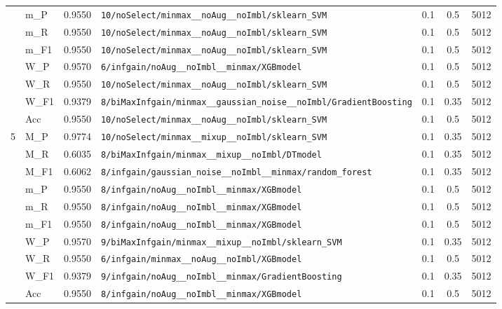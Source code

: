 \begin{table}[htbp]
\begin{tabular}{|c|l|c|>{\ttfamily\footnotesize}p{7.2cm}|c|c|c|}
 & m\_P & 0.9550 & \texttt{10/noSelect/minmax\_\_noAug\_\_noImbl/sklearn\_SVM} & 0.1 & 0.5  & 5012 \\ 
 & m\_R & 0.9550 & \texttt{10/noSelect/minmax\_\_noAug\_\_noImbl/sklearn\_SVM} & 0.1 & 0.5  & 5012 \\ 
 & m\_F1 & 0.9550 & \texttt{10/noSelect/minmax\_\_noAug\_\_noImbl/sklearn\_SVM} & 0.1 & 0.5  & 5012 \\ 
 & W\_P & 0.9570 & \texttt{6/infgain/noAug\_\_noImbl\_\_minmax/XGBmodel} & 0.1 & 0.5  & 5012 \\ 
 & W\_R & 0.9550 & \texttt{10/noSelect/minmax\_\_noAug\_\_noImbl/sklearn\_SVM} & 0.1 & 0.5  & 5012 \\ 
 & W\_F1 & 0.9379 & \texttt{8/biMaxInfgain/minmax\_\_gaussian\_noise\_\_noImbl/GradientBoosting} & 0.1 & 0.35  & 5012 \\ 
 & Acc & 0.9550 & \texttt{10/noSelect/minmax\_\_noAug\_\_noImbl/sklearn\_SVM} & 0.1 & 0.5  & 5012 \\ 
\hline
\multirow{10}{*}{5} & M\_P & 0.9774 & \texttt{10/noSelect/minmax\_\_mixup\_\_noImbl/sklearn\_SVM} & 0.1 & 0.35  & 5012 \\ 
 & M\_R & 0.6035 & \texttt{8/biMaxInfgain/minmax\_\_mixup\_\_noImbl/DTmodel} & 0.1 & 0.35  & 5012 \\ 
 & M\_F1 & 0.6062 & \texttt{8/infgain/gaussian\_noise\_\_noImbl\_\_minmax/random\_forest} & 0.1 & 0.35  & 5012 \\ 
 & m\_P & 0.9550 & \texttt{8/infgain/noAug\_\_noImbl\_\_minmax/XGBmodel} & 0.1 & 0.5  & 5012 \\ 
 & m\_R & 0.9550 & \texttt{8/infgain/noAug\_\_noImbl\_\_minmax/XGBmodel} & 0.1 & 0.5  & 5012 \\ 
 & m\_F1 & 0.9550 & \texttt{8/infgain/noAug\_\_noImbl\_\_minmax/XGBmodel} & 0.1 & 0.5  & 5012 \\ 
 & W\_P & 0.9570 & \texttt{9/biMaxInfgain/minmax\_\_mixup\_\_noImbl/sklearn\_SVM} & 0.1 & 0.35  & 5012 \\ 
 & W\_R & 0.9550 & \texttt{6/infgain/minmax\_\_noAug\_\_noImbl/XGBmodel} & 0.1 & 0.5  & 5012 \\ 
 & W\_F1 & 0.9379 & \texttt{9/infgain/noAug\_\_noImbl\_\_minmax/GradientBoosting} & 0.1 & 0.35  & 5012 \\ 
 & Acc & 0.9550 & \texttt{8/infgain/noAug\_\_noImbl\_\_minmax/XGBmodel} & 0.1 & 0.5  & 5012 \\ 
\hline
\end{tabular}
\end{table}